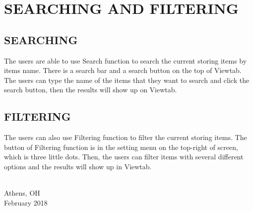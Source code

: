 \chapter{SEARCHING AND FILTERING}

\section{SEARCHING}
The users are able to use Search function to search the current storing items by items name. There is a search bar and a search button on the top of Viewtab. The users can type the name of the items that they want to search and click the search button, then the results will show up on Viewtab. 

\section{FILTERING}
The users can also use Filtering function to filter the current storing items. The button of Filtering function is in the setting menu on the top-right of screen, which is three little dots. Then, the users can filter items with several different options and the results will show up in Viewtab.



\vspace*{\fill}
{ \\ Athens, OH \\ February 2018\par}
